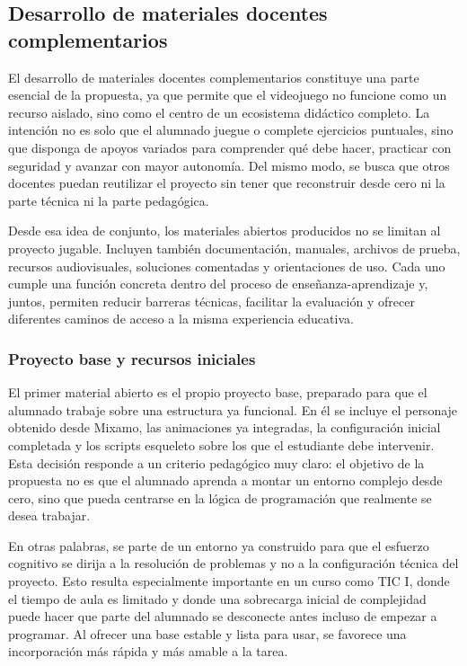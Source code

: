 \documentclass[a4paper,12pt]{article}
\begin{document}
\subsection{Desarrollo de materiales docentes complementarios}

El desarrollo de materiales docentes complementarios constituye una parte esencial de la propuesta, ya que permite que el videojuego no funcione como un recurso aislado, sino como el centro de un ecosistema didáctico completo. La intención no es solo que el alumnado juegue o complete ejercicios puntuales, sino que disponga de apoyos variados para comprender qué debe hacer, practicar con seguridad y avanzar con mayor autonomía. Del mismo modo, se busca que otros docentes puedan reutilizar el proyecto sin tener que reconstruir desde cero ni la parte técnica ni la parte pedagógica.

Desde esa idea de conjunto, los materiales abiertos producidos no se limitan al proyecto jugable. Incluyen también documentación, manuales, archivos de prueba, recursos audiovisuales, soluciones comentadas y orientaciones de uso. Cada uno cumple una función concreta dentro del proceso de enseñanza-aprendizaje y, juntos, permiten reducir barreras técnicas, facilitar la evaluación y ofrecer diferentes caminos de acceso a la misma experiencia educativa.

\subsubsection{Proyecto base y recursos iniciales}

El primer material abierto es el propio proyecto base, preparado para que el alumnado trabaje sobre una estructura ya funcional. En él se incluye el personaje obtenido desde Mixamo, las animaciones ya integradas, la configuración inicial completada y los scripts esqueleto sobre los que el estudiante debe intervenir. Esta decisión responde a un criterio pedagógico muy claro: el objetivo de la propuesta no es que el alumnado aprenda a montar un entorno complejo desde cero, sino que pueda centrarse en la lógica de programación que realmente se desea trabajar.

En otras palabras, se parte de un entorno ya construido para que el esfuerzo cognitivo se dirija a la resolución de problemas y no a la configuración técnica del proyecto. Esto resulta especialmente importante en un curso como TIC I, donde el tiempo de aula es limitado y donde una sobrecarga inicial de complejidad puede hacer que parte del alumnado se desconecte antes incluso de empezar a programar. Al ofrecer una base estable y lista para usar, se favorece una incorporación más rápida y más amable a la tarea.
\end{document}
